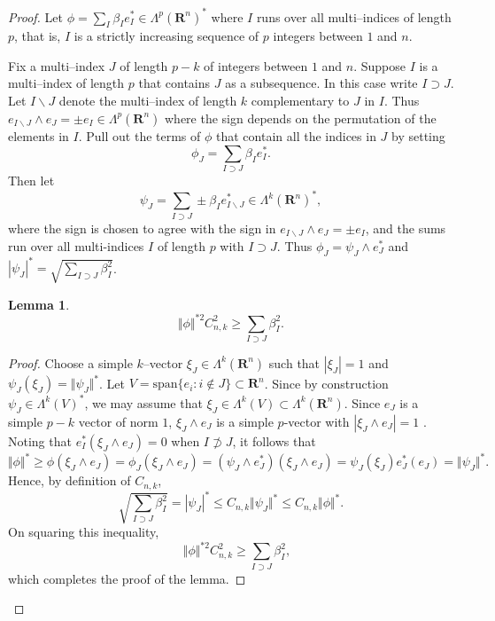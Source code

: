 \documentclass[12pt]{amsart}
\newtheorem{lemma}[theorem]{Lemma}
\theoremstyle{definition}
\theoremstyle{remark}
\numberwithin{equation}{section}
\begin{document}
\begin{proof}
Let $\phi = \sum_{I} \beta_I e_I^\ast  \in \Lambda^p(\mathbf{R}^n)^\ast$ where $I$ runs over all multi--indices of length $p$, that is, $I$ is a strictly increasing sequence of $p$ integers between $1$ and $n$.

Fix a multi--index $J$ of length $p-k$ of integers between $1$ and
$n$. Suppose $I$ is a multi--index of length $p$ that contains $J$ as
a subsequence.  In this case write $I \supset J$. Let $I\backslash J$
denote the multi--index of length $k$ complementary to $J$ in
$I$. Thus $e_{I\backslash J} \wedge e_J = \pm e_I \in
\Lambda^p(\mathbf{R}^n)$ where the sign depends on the permutation of
the elements in $I$. Pull out the terms of $\phi$ that contain all the
indices in $J$ by setting
\begin{equation*}
\phi_J  =  \sum_{I\supset J}  \beta_I e_I^\ast.
\end{equation*}
Then let
\begin{equation*}
\psi_J = \sum_{I\supset J} \pm \beta_I e^\ast_{I\backslash J} \in \Lambda^k(\mathbf{R}^n)^\ast,
\end{equation*}
 where  the sign is chosen to agree with the sign in $e_{I\backslash J} \wedge e_J = \pm e_I$, and the sums run over all multi-indices $I$ of length $p$ with $I \supset J$.
 Thus $\phi_J = \psi_J\wedge e_J^\ast$ and $ | \psi_J|^\ast =  \sqrt{\sum_{I \supset J} \beta_I^2}$.
 
 \begin{lemma}%
 \begin{equation}\label{e:i2}
   \Vert \phi\Vert^{\ast2} C_{n,k}^2 \geq\sum_{I \supset J} \beta_I^2.
  \end{equation}
 \end{lemma}
 
 \begin{proof}
 Choose a simple $k$--vector  $\xi_J \in \Lambda^k(\mathbf{R}^n)$ such that $|\xi_J|=1$ and $ \psi_J(\xi_J) = \Vert \psi_J\Vert^\ast$. Let $V = \mathrm{span}\{ e_i : i \notin J\} \subset \mathbf{R}^n$. Since by construction $ \psi_J \in \Lambda^k(V)^\ast$, we may assume that $ \xi_J \in \Lambda^k(V) \subset \Lambda^k(\mathbf{R}^n)$.  Since $e_J$ is a simple $p-k$ vector of norm $1$, $ \xi_J \wedge e_J$ is a simple $p$-vector with $| \xi_J \wedge e_J|=1$ . Noting that $e_I^\ast(\xi_J\wedge e_J)=0$ when $I\not\supset J$, it follows that
 \begin{equation*}\Vert \phi\Vert^\ast \geq  \phi( \xi_J \wedge e_J)=  \phi_J( \xi_J \wedge e_J) = (\psi_J\wedge e_J^\ast)( \xi_J \wedge e_J)=\psi_J(\xi_J)e_J^\ast(e_J)  =  \Vert \psi_J\Vert^\ast.
 \end{equation*}
Hence, by definition of $C_{n,k}$,
\begin{equation*}
  \sqrt{\sum_{I \supset J} \beta_I^2} = |\psi_J|^\ast \leq C_{n,k} \Vert \psi_J\Vert^\ast \leq C_{n,k} \Vert \phi \Vert^\ast.
 \end{equation*} 
On squaring this inequality,
 \begin{equation*}
 \quad  \Vert \phi\Vert^{\ast2} C_{n,k}^2 \geq \sum_{I \supset J} \beta_I^2,
 \end{equation*}
 which completes the proof of the lemma.
 \end{proof}
 

\end{proof}
\end{document}
